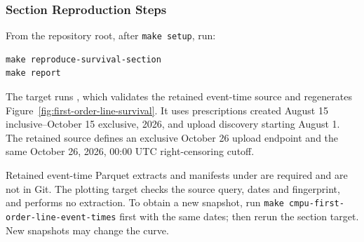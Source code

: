 \clearpage
\subsubsection{Section Reproduction Steps}\label{subsubsec:reproduce-survival}
From the repository root, after \texttt{make setup}, run:
\begin{lstlisting}[basicstyle=\ttfamily\small,breaklines=true]
make reproduce-survival-section
make report
\end{lstlisting}
The target runs , which validates the
retained event-time source and regenerates
Figure~\ref{fig:first-order-line-survival}. It uses prescriptions created
August 15 inclusive--October 15 exclusive, 2026, and upload discovery starting
August 1. The retained source defines an exclusive October 26 upload endpoint
and the same October 26, 2026, 00:00 UTC right-censoring cutoff.

Retained event-time Parquet extracts and manifests under
 are required and are not in Git.
The plotting target checks the source query, dates and fingerprint, and performs
no extraction. To obtain a new snapshot, run
\texttt{make cmpu-first-order-line-event-times} first with the same dates;
then rerun the section target. New snapshots may change the curve.
